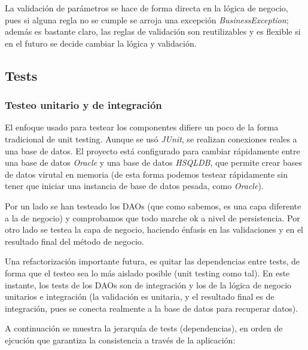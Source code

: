 \documentclass[letter]{article}
\begin{document}
La validación de parámetros se hace de forma directa en la lógica de negocio, pues si alguna regla no se cumple se arroja una excepción \textit{BusinessException}; además es bastante claro, las reglas de validación son reutilizables y es flexible si en el futuro se decide cambiar la lógica y validación.

\subsection{Tests}

\subsubsection{Testeo unitario y de integración}

El enfoque usado para testear los componentes difiere un poco de la forma tradicional de unit testing. Aunque se usó \textit{JUnit}, se realizan conexiones reales a una base de datos. El proyecto está configurado para cambiar rápidamente entre una base de datos \textit{Oracle} y una base de datos \textit{HSQLDB}, que permite crear bases de datos virutal en memoria (de esta forma podemos testear rápidamente sin tener que iniciar una instancia de base de datos pesada, como \textit{Oracle}).

Por un lado se han testeado los DAOs (que como sabemos, es una capa diferente a la de negocio) y comprobamos que todo marche ok a nivel de persistencia. Por otro lado se testea la capa de negocio, haciendo énfasis en las validaciones y en el resultado final del método de negocio.

Una refactorización importante futura, es quitar las dependencias entre tests, de forma que el testeo sea lo más aislado posible (unit testing como tal). En este instante, los tests de los DAOs son de integración y los de la lógica de negocio unitarios e integración (la validación es unitaria, y el resultado final es de integración, pues se conecta realmente a la base de datos para recuperar datos).

A continuación se muestra la jerarquía de tests (dependencias), en orden de ejcución que garantiza la consistencia a través de la aplicación:
\end{document}
